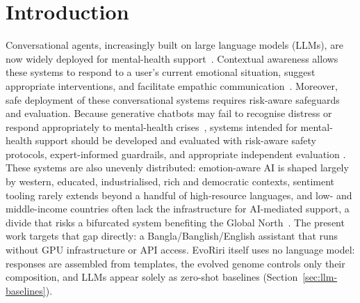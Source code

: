 \documentclass[mathematics,article,submit,xetex,moreauthors]{Definitions/mdpi}
\begin{document}

\section{Introduction}

Conversational agents, increasingly built on large language models (LLMs),
are now widely deployed for mental-health
support~\cite{jmir2025_chatbots,pmc2026_chatbots}. Contextual awareness allows these systems to respond to a user’s current emotional situation, suggest appropriate interventions, and facilitate empathic communication~\cite{jmir2024_empathic}. 
Moreover, safe deployment of these conversational systems requires risk-aware safeguards and evaluation.
Because generative chatbots may fail to recognise distress or respond appropriately to
mental-health crises~\cite{harvard2024_safety}, systems intended for
mental-health support should be developed and evaluated with risk-aware safety
protocols, expert-informed guardrails, and appropriate independent evaluation
\cite{apa2025_advisory}.
These systems are also unevenly distributed: emotion-aware AI is shaped
largely by western, educated, industrialised, rich and democratic contexts,
sentiment tooling rarely extends beyond a handful of high-resource
languages, and low- and middle-income countries often lack the
infrastructure for AI-mediated support, a divide that risks a bifurcated
system benefiting the Global North~\cite{ijca2025emotion}. The present work
targets that gap directly: a Bangla/Banglish/English assistant that runs
without GPU infrastructure or API access. EvoRiri itself uses no language model: responses are assembled from templates, the evolved genome controls only their composition, and LLMs appear solely as zero-shot baselines (Section~\ref{sec:llm-baselines}).
\end{document}
